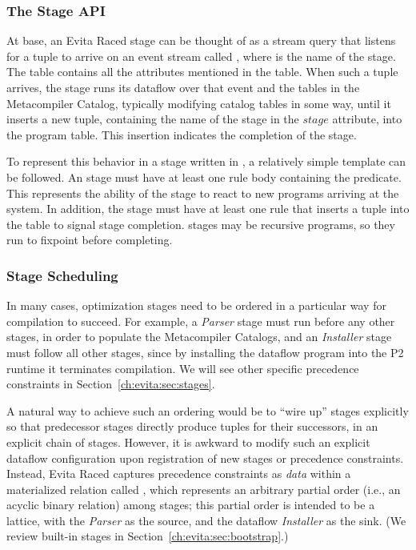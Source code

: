 \subsubsection{The Stage API}
At base, an Evita Raced stage can be thought of as a stream query that listens for a tuple to arrive on an event stream called , where  is the name of the stage. 
The  table contains all the attributes mentioned in the  table. When such a tuple arrives, the stage runs its dataflow over that event and the tables in the Metacompiler Catalog, typically modifying catalog tables in some way, until it inserts a new  tuple, containing the name of the stage in
the $stage$ attribute, into the program table. This insertion indicates
the completion of the stage.

To represent this behavior in a stage written in \OVERLOG, a relatively
simple template can be followed.  An \OVERLOG stage must have at least
one rule body containing the  predicate. This 
represents the ability of the stage to react to new programs arriving at
the system.  In addition, the stage must have
at least one rule that
inserts a  tuple into the  table to signal stage
completion.  \OVERLOG stages may be recursive programs, so they run
to fixpoint before completing.

\subsubsection{Stage Scheduling}
\label{ch:evita:sec:stageschedule}
In many cases, optimization stages need to be ordered in a particular way for compilation to succeed.  For example, 
a {\em Parser} stage must run before any other stages, in order to populate the Metacompiler Catalogs, and an 
{\em Installer} stage must follow all other stages, since by installing the dataflow program into the P2 runtime it 
terminates compilation. We will see other specific precedence constraints in Section~\ref{ch:evita:sec:stages}.  


A natural way to achieve such an ordering would be to ``wire up'' stages explicitly so that 
predecessor stages directly produce  tuples for their successors, 
in an explicit chain of stages.  However, it is awkward to modify such an explicit dataflow configuration 
upon registration of new stages or precedence constraints. Instead, Evita Raced captures precedence 
constraints as {\em data} within a materialized
relation called , which represents an arbitrary partial
order (i.e., an acyclic binary relation) among stages; this partial
order is intended to be a lattice, with the {\em Parser} as the source,
and the dataflow {\em Installer} as the sink.  (We review built-in stages in Section~\ref{ch:evita:sec:bootstrap}.)
 
